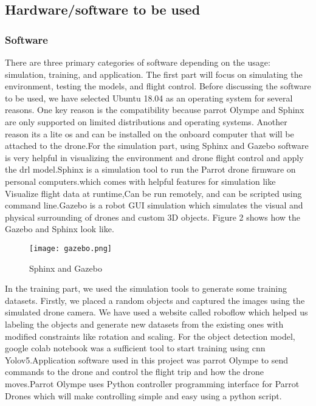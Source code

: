 \documentclass[../main.tex]{subfiles}
\begin{document}
\subsection{Hardware/software to be used}

\subsubsection{Software}
There are three primary categories of software depending on the usage: simulation, training, and application. The first part will focus on simulating the environment, testing the models, and flight control. Before discussing the software to be used, we have selected Ubuntu 18.04 as an operating system for several reasons. One key reason is the compatibility because parrot Olympe and Sphinx are only supported on limited distributions and operating systems. Another reason its a lite os and can be installed on the onboard computer that will be attached to the drone.For the simulation part, using Sphinx and Gazebo software is very helpful in visualizing the environment and drone flight control and apply the \gls{drl} model.Sphinx is a simulation tool to run the Parrot drone firmware on personal computers.which comes with helpful features for simulation like Visualize flight data at runtime,Can be run remotely, and can be scripted using command line.Gazebo is a robot GUI simulation which simulates the visual and physical surrounding of drones and custom 3D objects. Figure 2 shows how the Gazebo and Sphinx look like.  \begin{figure}[H]
	\centering
	\texttt{[image: gazebo.png]}
	\caption{Sphinx and Gazebo }\label{fig2:gazebo}
\end{figure}
In the training part, we used the simulation tools to generate some training datasets. Firstly, we placed a random objects and captured the images using the simulated drone camera. We have used a website called roboflow which helped us labeling the objects and generate new datasets from the existing ones with modified constraints like rotation and scaling. For the object detection model, google colab notebook was a sufficient tool to start training using \gls{cnn} Yolov5.Application software used in this project was parrot Olympe to send commands to the drone and control the flight trip and how the drone moves.Parrot Olympe uses Python controller programming interface for Parrot Drones which will make controlling simple and easy using a python script.
\end{document}
